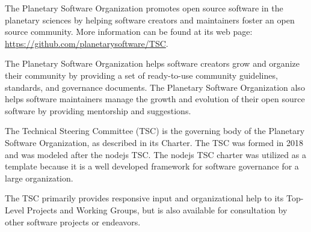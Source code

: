 \documentclass[twoside]{article}
\begin{document}


%

%


The Planetary Software Organization promotes open source software
in the planetary sciences by helping software creators and maintainers
foster an open source community. More information can be found at
its web page: \url{https://github.com/planetarysoftware/TSC}.


The Planetary Software Organization helps software creators grow
and organize their community by providing a set of ready-to-use
community guidelines, standards, and governance documents. The
Planetary Software Organization also helps software maintainers
manage the growth and evolution of their open source software by
providing mentorship and suggestions.

The Technical Steering Committee (TSC) is the governing body of the
Planetary Software Organization, as described in its Charter. The TSC
was formed in 2018 and was modeled after the nodejs TSC. The nodejs
TSC charter was utilized as a template because it is a well developed 
framework for software governance for a large organization. 

The TSC primarily provides responsive input and organizational help
to its Top-Level Projects and Working Groups, but is also available
for consultation by other software projects or endeavors.
\end{document}

